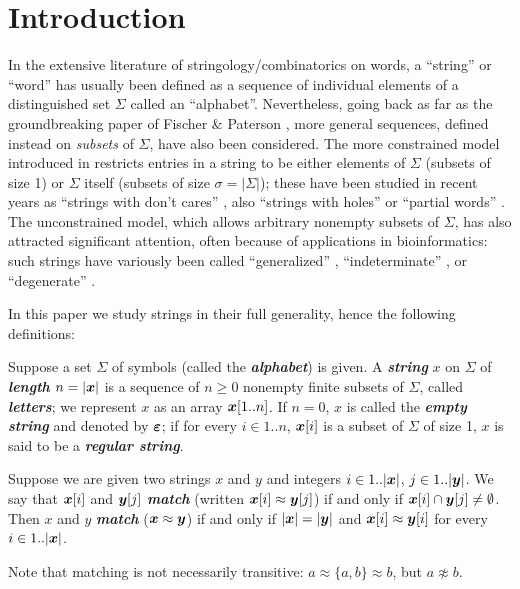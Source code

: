 \documentclass[runningheads,a4paper]{llncs}
\def\s#1{\mbox{\boldmath $#1$}}
\def\itbf#1{\textit{\textbf{#1}}}
\def\match{\approx}
\begin{document}
\section{Introduction}
\label{sect-intro}
In the extensive literature of stringology/combinatorics on words,
a ``string'' or ``word'' has usually been defined as a sequence
of individual elements of a distinguished set $\Sigma$ called an ``alphabet''.
Nevertheless, going back as far as the groundbreaking paper of
Fischer \& Paterson \cite{FP74}, more general sequences,
defined instead on {\it subsets} of $\Sigma$, have also been considered.
The more constrained model introduced in \cite{FP74} restricts
entries in a string to be either elements of $\Sigma$
(subsets of size 1) or $\Sigma$ itself (subsets of size $\sigma = |\Sigma|$);
these have been studied in recent years as
``strings with don't cares'' \cite{IMMP03}, also
``strings with holes'' or ``partial words'' \cite{BS08}.
The unconstrained model, which allows arbitrary nonempty subsets of $\Sigma$,
has also attracted significant attention,
often because of applications in bioinformatics:
such strings have variously been called ``generalized'' \cite{A87},
``indeterminate'' \cite{HS03}, or ``degenerate'' \cite{IMR08}.

In this paper we study strings
in their full generality,
hence the following definitions:

\begin{definition}
\label{defn-string}
Suppose a set $\Sigma$ of symbols (called the \itbf{alphabet}) is given.
A \itbf{string} \s{x} on $\Sigma$ of \itbf{length} $n = |\s{x}|$ is a sequence
of $n \ge 0$ nonempty finite subsets of $\Sigma$, called \itbf{letters};
we represent \s{x} as an array $\s{x}[1..n]$.
If $n = 0$, \s{x} is called the \itbf{empty string}
and denoted by $\s{\varepsilon}$;
if for every $i \in 1..n$, $\s{x}[i]$ is a subset of $\Sigma$ of size 1,
\s{x} is said to be a \itbf{regular string}.
\end{definition}

\begin{definition}
\label{defn-match}
Suppose we are given two strings \s{x} and \s{y} and integers $i \in 1..|\s{x}|$,
$j \in 1..|\s{y}|$. We say that $\s{x}[i]$ and $\s{y}[j]$ \itbf{match}
(written $\s{x}[i] \match \s{y}[j]$) if and only if $\s{x}[i] \cap \s{y}[j] \ne \emptyset$. Then \s{x} and \s{y} \itbf{match} ($\s{x} \match \s{y}$)
if and only if $|\s{x}| = |\s{y}|$
and $\s{x}[i] \match \s{y}[i]$ for every $i \in 1..|\s{x}|$.
\end{definition}
Note that matching is not necessarily transitive:
$a \match \{a,b\} \match b$, but $a \not\match b$.
\end{document}
